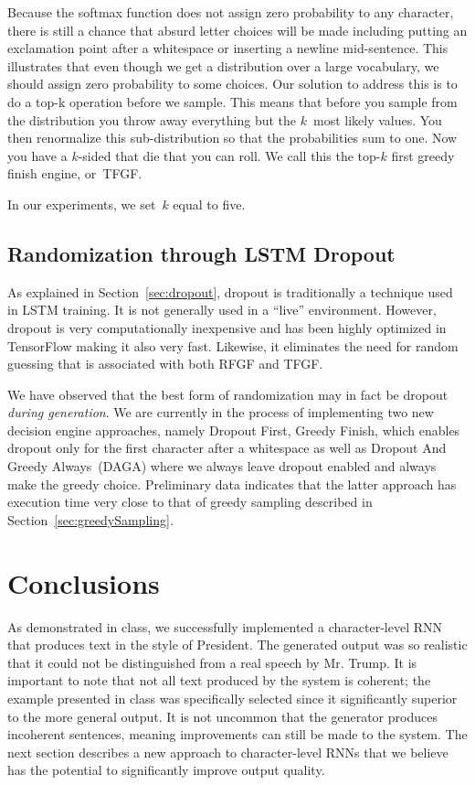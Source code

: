 \documentclass{article}
\begin{document}
Because the softmax function does not assign zero probability to any character, there is still a chance that absurd letter choices will be made including putting an exclamation point after a whitespace or inserting a newline mid-sentence.  This illustrates that even though we get a distribution over a large vocabulary, we should assign zero probability to some choices. Our solution to address this is to do a top-k operation before we sample. This means that before you sample from the distribution you throw away everything but the $k$~most likely values. You then renormalize this sub-distribution so that the probabilities sum to one. Now you have a $k$-sided that die that you can roll. We call this the top-$k$ first greedy finish engine, or~TFGF.

In our experiments, we set~$k$ equal to five.

\subsection{Randomization through LSTM Dropout}

As explained in Section~\ref{sec:dropout}, dropout is traditionally a technique used in LSTM training.  It is not generally used in a ``live'' environment.  However, dropout is very computationally inexpensive and has been highly optimized in TensorFlow making it also very fast.  Likewise, it eliminates the need for random guessing that is associated with both RFGF and TFGF.

We have observed that the best form of randomization may in fact be dropout \textit{during generation}.  We are currently in the process of implementing two new decision engine approaches, namely Dropout First, Greedy Finish, which enables dropout only for the first character after a whitespace as well as Dropout And Greedy Always~(DAGA) where we always leave dropout enabled and always make the greedy choice.  Preliminary data indicates that the latter approach has execution time very close to that of greedy sampling described in Section~\ref{sec:greedySampling}.

\section{Conclusions}

As demonstrated in class, we successfully implemented a character-level RNN that produces text in the style of President.  The generated output was so realistic that it could not be distinguished from a real speech by Mr. Trump.  It is important to note that not all text produced by the system is coherent; the example presented in class was specifically selected since it significantly superior to the more general output.  It is not uncommon that the generator produces incoherent sentences, meaning improvements can still be made to the system.  The next section describes a new approach to character-level RNNs that we believe has the potential to significantly improve output quality.
\end{document}
